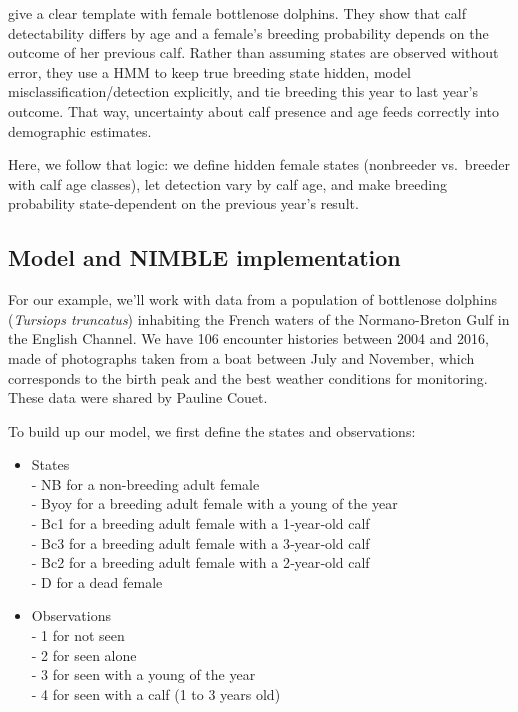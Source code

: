 \documentclass[
  12pt,
]{krantz}
\begin{document}
\citet{couet2019} give a clear template with female bottlenose dolphins. They show that calf detectability differs by age and a female's breeding probability depends on the outcome of her previous calf. Rather than assuming states are observed without error, they use a HMM to keep true breeding state hidden, model misclassification/detection explicitly, and tie breeding this year to last year's outcome. That way, uncertainty about calf presence and age feeds correctly into demographic estimates.

Here, we follow that logic: we define hidden female states (nonbreeder vs.~breeder with calf age classes), let detection vary by calf age, and make breeding probability state-dependent on the previous year's result.

\subsection{Model and NIMBLE implementation}\label{model-and-nimble-implementation-7}

For our example, we'll work with data from a population of bottlenose dolphins (\emph{Tursiops truncatus}) inhabiting the French waters of the Normano-Breton Gulf in the English Channel. We have 106 encounter histories between 2004 and 2016, made of photographs taken from a boat between July and November, which corresponds to the birth peak and the best weather conditions for monitoring. These data were shared by Pauline Couet.

To build up our model, we first define the states and observations:

\begin{itemize}
\item
  States\\
  - NB for a non-breeding adult female\\
  - Byoy for a breeding adult female with a young of the year\\
  - Bc1 for a breeding adult female with a 1‐year‐old calf\\
  - Bc3 for a breeding adult female with a 3‐year‐old calf\\
  - Bc2 for a breeding adult female with a 2‐year‐old calf\\
  - D for a dead female
\item
  Observations\\
  - 1 for not seen\\
  - 2 for seen alone\\
  - 3 for seen with a young of the year\\
  - 4 for seen with a calf (1 to 3 years old)
\end{itemize}
\end{document}
